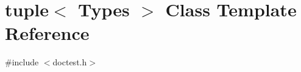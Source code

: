 \hypertarget{classtuple}{}\section{tuple$<$ Types $>$ Class Template Reference}
\label{classtuple}


{\ttfamily \#include $<$doctest.\+h$>$}

